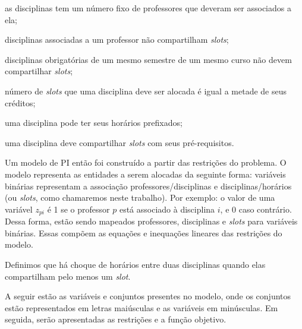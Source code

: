 \begin{alineascomponto}
\item as disciplinas tem um número fixo de professores que deveram ser associados a ela;
\item disciplinas associadas a um professor não compartilham \textit{slots};
\item disciplinas obrigatórias de um mesmo semestre de um mesmo curso não devem compartilhar \textit{slots};
\item número de \textit{slots} que uma disciplina deve ser alocada é igual a metade de seus créditos;
\item uma disciplina pode ter seus horários prefixados;
\item uma disciplina deve compartilhar \textit{slots} com seus pré-requisitos.
\end{alineascomponto} 

Um modelo de PI então foi construído a partir das restrições do problema. O modelo representa as entidades a serem alocadas da seguinte forma: variáveis binárias representam a associação professores/disciplinas e disciplinas/horários (ou \textit{slots}, como chamaremos neste trabalho). Por exemplo: o valor de uma variável $z_{pi}$ é 1 se o professor $p$ está associado à disciplina $i$, e 0 caso contrário. Dessa forma, estão sendo mapeados professores, disciplinas e \textit{slots} para variáveis binárias. Essas compõem as equações e inequações lineares das restrições do modelo.

Definimos que há choque de horários entre duas disciplinas quando elas compartilham pelo menos um \textit{slot}.

A seguir estão as variáveis e conjuntos presentes no modelo, onde os conjuntos estão representados em letras maiúsculas e as variáveis em minúsculas. Em seguida, serão apresentadas as restrições e a função objetivo.

